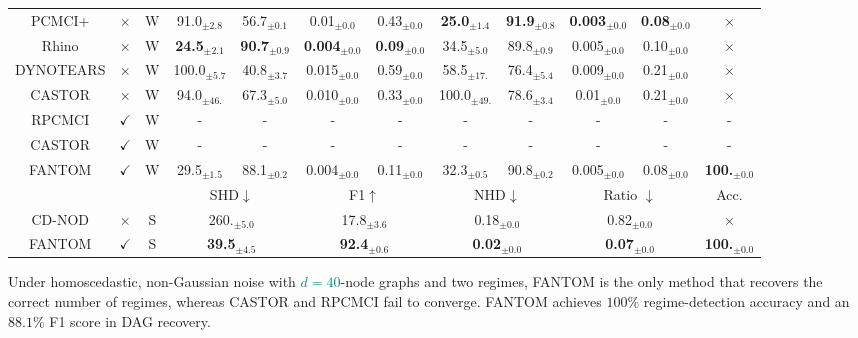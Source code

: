 \begin{table}[H]
{\begin{tabular}{@{}ccc|cccccccc|c@{}}
PCMCI+ & $\times$ & W  & 91.0$_{\pm2.8}$   & 56.7$_{\pm0.1}$  & 0.01$_{\pm0.0}$ & 0.43$_{\pm0.0}$  &
            \textbf{25.0}$_{\pm1.4}$   & \textbf{91.9}$_{\pm0.8}$  & \textbf{0.003}$_{\pm0.0}$ & \textbf{0.08}$_{\pm0.0}$ & $\times$ \\
    Rhino & $\times$ & W & \textbf{24.5}$_{\pm2.1}$   & \textbf{90.7}$_{\pm0.9}$  & \textbf{0.004}$_{\pm0.0}$ & \textbf{0.09}$_{\pm0.0}$  &
            34.5$_{\pm5.0}$   & 89.8$_{\pm0.9}$  & 0.005$_{\pm0.0}$ & 0.10$_{\pm0.0}$ & $\times$ \\
    DYNOTEARS & $\times$ & W &  100.0$_{\pm5.7}$  & 40.8$_{\pm3.7}$  & 0.015$_{\pm0.0}$ & 0.59$_{\pm0.0}$  &
            58.5$_{\pm17.}$  & 76.4$_{\pm5.4}$  & 0.009$_{\pm0.0}$ & 0.21$_{\pm0.0}$  & $\times$  \\
    CASTOR & $\times$ & W & 94.0$_{\pm46.}$  & 67.3$_{\pm5.0}$  & 0.010$_{\pm0.0}$ & 0.33$_{\pm0.0}$  &
            100.0$_{\pm49.}$ & 78.6$_{\pm3.4}$  & 0.01$_{\pm0.0}$ & 0.21$_{\pm0.0}$ & $\times$  \\
    \midrule
    RPCMCI & $\checkmark$ & W & - & - & - & - & - & - & - & - & -  \\
    CASTOR & $\checkmark$ & W & - & - & - & - & - & - & - & - & -  \\
    \rowcolor{gray!20} FANTOM & $\checkmark$  & W & 29.5$_{\pm1.5}$ & 88.1$_{\pm0.2}$ & 0.004$_{\pm0.0}$ & 0.11$_{\pm0.0}$  & 32.3$_{\pm0.5}$ & 90.8$_{\pm0.2}$ & 0.005$_{\pm0.0}$& 0.08$_{\pm0.0}$& \textbf{100.}$_{\pm0.0}$  \\
    \midrule
      &   &  &\multicolumn{2}{c}{SHD$\downarrow$ } &\multicolumn{2}{c}{F1$\uparrow$} & \multicolumn{2}{c}{NHD$\downarrow$} & \multicolumn{2}{c|}{Ratio $\downarrow$ } & Acc.\\
    \midrule
    CD-NOD & $\times$ & S & \multicolumn{2}{c}{260.$_{\pm5.0}$} &\multicolumn{2}{c}{17.8$_{\pm3.6}$} & \multicolumn{2}{c}{0.18$_{\pm0.0}$} & \multicolumn{2}{c|}{0.82$_{\pm0.0}$} & $\times$ \\
    \rowcolor{gray!20} FANTOM & $\checkmark$ & S & \multicolumn{2}{c}{\textbf{39.5}$_{\pm4.5}$} &\multicolumn{2}{c}{\textbf{92.4}$_{\pm0.6}$} & \multicolumn{2}{c}{\textbf{0.02}$_{\pm0.0}$} & \multicolumn{2}{c|}{\textbf{0.07}$_{\pm0.0}$} & \textbf{100.}$_{\pm0.0}$  \\ \bottomrule
\end{tabular}}
\end{table}
Under homoscedastic, non-Gaussian noise with \textcolor{teal}{$d=40$}\nobreakdash-node graphs and two regimes, FANTOM is the only method that recovers the correct number of regimes, whereas CASTOR and RPCMCI fail to converge. FANTOM achieves $100\%$ regime-detection accuracy and an $88.1\%$ F1 score in DAG recovery.

